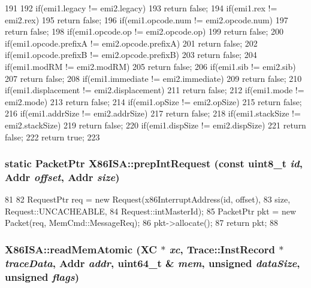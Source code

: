 \begin{DoxyCode}
191     {
192         if(emi1.legacy != emi2.legacy)
193             return false;
194         if(emi1.rex != emi2.rex)
195             return false;
196         if(emi1.opcode.num != emi2.opcode.num)
197             return false;
198         if(emi1.opcode.op != emi2.opcode.op)
199             return false;
200         if(emi1.opcode.prefixA != emi2.opcode.prefixA)
201             return false;
202         if(emi1.opcode.prefixB != emi2.opcode.prefixB)
203             return false;
204         if(emi1.modRM != emi2.modRM)
205             return false;
206         if(emi1.sib != emi2.sib)
207             return false;
208         if(emi1.immediate != emi2.immediate)
209             return false;
210         if(emi1.displacement != emi2.displacement)
211             return false;
212         if(emi1.mode != emi2.mode)
213             return false;
214         if(emi1.opSize != emi2.opSize)
215             return false;
216         if(emi1.addrSize != emi2.addrSize)
217             return false;
218         if(emi1.stackSize != emi2.stackSize)
219             return false;
220         if(emi1.dispSize != emi2.dispSize)
221             return false;
222         return true;
223     }
\end{DoxyCode}
\hypertarget{namespaceX86ISA_adda83aa8585dccaf070e3edf66f2b9ab}{
\subsubsection[{prepIntRequest}]{\setlength{\rightskip}{0pt plus 5cm}static {\bf PacketPtr} X86ISA::prepIntRequest (const uint8\_\-t {\em id}, \/  {\bf Addr} {\em offset}, \/  {\bf Addr} {\em size})}}
\label{namespaceX86ISA_adda83aa8585dccaf070e3edf66f2b9ab}



\begin{DoxyCode}
81     {
82         RequestPtr req = new Request(x86InterruptAddress(id, offset),
83                                      size, Request::UNCACHEABLE,
84                                      Request::intMasterId);
85         PacketPtr pkt = new Packet(req, MemCmd::MessageReq);
86         pkt->allocate();
87         return pkt;
88     }
\end{DoxyCode}
\hypertarget{namespaceX86ISA_a3afb16e9fda02e17519871c8004ebdb9}{
\subsubsection[{readMemAtomic}]{ X86ISA::readMemAtomic (XC $\ast$ {\em xc}, \/  {\bf Trace::InstRecord} $\ast$ {\em traceData}, \/  {\bf Addr} {\em addr}, \/  uint64\_\-t \& {\em mem}, \/  unsigned {\em dataSize}, \/  unsigned {\em flags})}}
\label{namespaceX86ISA_a3afb16e9fda02e17519871c8004ebdb9}



